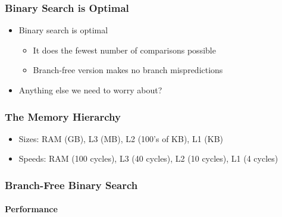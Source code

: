 \documentclass[xcolor=dvipsnames]{beamer}
\begin{document}
\begin{frame}
   \frametitle{Binary Search is Optimal}

   \begin{itemize}[<+->]
     \item Binary search is optimal 
     \begin{itemize}
       \item It does the fewest number of comparisons possible
       \item Branch-free version makes no branch mispredictions
     \end{itemize}
     \item Anything else we need to worry about?
   \end{itemize}
\end{frame}


\begin{frame}
   \frametitle{The Memory Hierarchy}

   \begin{center}
   \end{center}
   \begin{itemize}
     \item<+->Sizes: RAM (GB), L3 (MB), L2 (100's of KB), L1 (KB)
     \item<+->Speeds: RAM (100 cycles), L3 (40 cycles), L2 (10 cycles), L1 (4 cycles)
   \end{itemize}
   
\end{frame}

\begin{frame}
   \frametitle{Branch-Free Binary Search}
   \framesubtitle{Performance}

   \begin{center}
   \end{center}
\end{frame}
\end{document}
